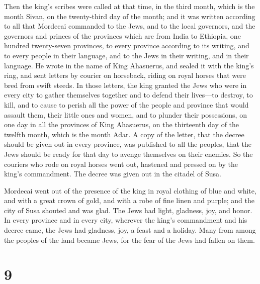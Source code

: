  Then the king's scribes were called at that time, in the
third month, which is the month Sivan, on the twenty-third day of the
month; and it was written according to all that Mordecai commanded to
the Jews, and to the local governors, and the governors and princes of
the provinces which are from India to Ethiopia, one hundred twenty-seven
provinces, to every province according to its writing, and to every
people in their language, and to the Jews in their writing, and in their
language.  He wrote in the name of King Ahasuerus, and
sealed it with the king's ring, and sent letters by courier on
horseback, riding on royal horses that were bred from swift steeds.
 In those letters, the king granted the Jews who were in
every city to gather themselves together and to defend their lives---to
destroy, to kill, and to cause to perish all the power of the people and
province that would assault them, their little ones and women, and to
plunder their possessions,  on one day in all the provinces
of King Ahasuerus, on the thirteenth day of the twelfth month, which is
the month Adar.  A copy of the letter, that the decree
should be given out in every province, was published to all the peoples,
that the Jews should be ready for that day to avenge themselves on their
enemies.  So the couriers who rode on royal horses went
out, hastened and pressed on by the king's commandment. The decree was
given out in the citadel of Susa.

 Mordecai went out of the presence of the king in royal
clothing of blue and white, and with a great crown of gold, and with a
robe of fine linen and purple; and the city of Susa shouted and was
glad.  The Jews had light, gladness, joy, and honor.
 In every province and in every city, wherever the king's
commandment and his decree came, the Jews had gladness, joy, a feast and
a holiday. Many from among the peoples of the land became Jews, for the
fear of the Jews had fallen on them.

\hypertarget{section-8}{%
\section{9}\label{section-8}}

